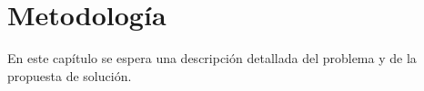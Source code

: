\chapter{Metodología}\label{cap:metodology}

En este capítulo se espera una descripción detallada del problema y de la propuesta de solución.

